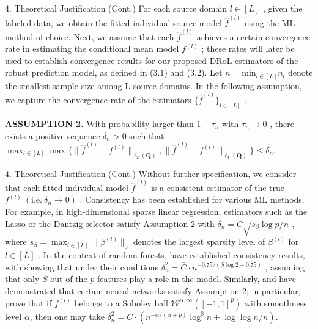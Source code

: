\documentclass{beamer}
\begin{document}
\begin{frame}{4. Theoretical Justification (Cont.)}
    For each source domain $l \in [ L ]$ , given the labeled data, we obtain the fitted individual source model ${ \widehat { f } } ^ { ( l ) }$ using the ML method of choice. Next, we assume that each ${ \widehat { f } } ^ { ( l ) }$ achieves a certain convergence rate in estimating the conditional mean model $f ^ { ( l ) }$ ; these rates will later be used to establish convergence results for our proposed DRoL estimators of the robust prediction model, as defined in (3.1) and (3.2). Let $n = \mathrm { m i n } _ { l \in [ L ] } n _ { l }$ denote the smallest sample size among L source domains. In the following assumption, we capture the convergence rate of the estimators $\{ \widehat { f } ^ { ( l ) } \} _ { l \in [ L ] }$ .
    
    \textbf{ASSUMPTION 2.} With probability larger than $1 - \tau _ { n }$ with $\tau _ { n } \to 0$ , there exists a positive sequence $\delta _ { n } > 0$ such that $\max _ { l \in [ L ] } \max \{ \| \widehat { f } ^ { ( l ) } - f ^ { ( l ) } \| _ { \ell _ { 2 } ( \mathbf { Q } ) } , \| \widehat { f } ^ { ( l ) } - f ^ { ( l ) } \| _ { \ell _ { 4 } ( \mathbf { Q } ) } \} \leq \delta _ { n }$.
\end{frame}

\begin{frame}{4. Theoretical Justification (Cont.)}
    Without further specification, we consider that each fitted individual model ${ \widehat { f } } ^ { ( l ) }$ is a consistent estimator of the true $f ^ { ( l ) } \ ( { \mathrm { i . e . } } \ \delta _ { n } \to 0 )$ . Consistency has been established for various ML methods. For example, in high-dimensional sparse linear regression, estimators such as the Lasso or the Dantzig selector satisfy Assumption 2 with $\delta _ { n } = C \sqrt { s _ { \beta } \log p / n }$ , where $s _ { \beta } = \operatorname* { m a x } _ { l \in [ L ] } \| \beta ^ { ( l ) } \| _ { 0 }$ denotes the largest sparsity level of $\beta ^ { ( l ) }$ for $l \in [ L ]$ \cite{10,7}. In the context of random forests, \cite{6, 5, 51, 33} have established consistency results, with \cite{5} showing that under their conditions $\delta _ { n } ^ { 2 } = \bar { C } \cdot n ^ { - 0 . 7 5 / ( S \log 2 + 0 . 7 5 ) }$ , assuming that only $S$ out of the $p$ features play a role in the model. Similarly, \cite{49} and \cite{18} have demonstrated that certain neural networks satisfy Assumption 2; in particular, \cite{18} prove that if $f ^ { ( l ) }$ belongs to a Sobolev ball $\mathcal { W } ^ { \alpha , \infty } ( [ - 1 , 1 ] ^ { p } )$ with smoothness level $\alpha$, then one may take $\delta _ { n } ^ { 2 } = C \cdot ( n ^ { - \alpha / ( \alpha + p ) } \log ^ { 8 } n + \log \log n / n )$.
\end{frame}
\end{document}
